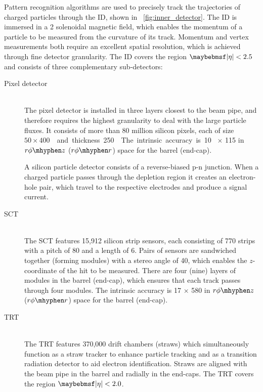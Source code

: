 Pattern recognition algorithms are used to precisely track the trajectories of charged 
particles through the \ac{ID}, shown in \Figure~\ref{fig:inner_detector}. The \ac{ID} is 
immersed in a \unit{2}{\tesla} solenoidal magnetic field, which enables the momentum of a 
particle to be measured from the curvature of its track. Momentum and vertex measurements
both require an excellent spatial resolution, which is achieved through fine detector 
granularity. The \ac{ID} covers the region $\mods{\eta} < 2.5$ and consists of three 
complementary sub-detectors:
\begin{description}
\item[Pixel detector] \hfill \\
	The pixel detector is installed in three layers closest to the beam pipe, and 
	therefore requires the highest granularity to deal with the large particle fluxes.
	It consists of more than 80 million silicon pixels, each of size 
	\unit{$50 \times 400$}{\micro\metre\squared} and thickness \unit{250}{\micro\metre}. 
	The intrinsic accuracy is \unit{10}{\micro\metre}$\,\times\,$\unit{115}{\micro\metre} 
	in $r\phi \mhyphen z$ ($r\phi \mhyphen r$) space for the barrel (end-cap).

	A silicon particle detector consists of a reverse-biased p-n junction. When a charged
	particle passes through the depletion region it creates an electron-hole pair, which 
	travel to the respective electrodes and produce a signal current.
\item[\ac{SCT}] \hfill \\
	The \ac{SCT} features 15,912 silicon strip sensors, each consisting of 770 strips 
	with a pitch of \unit{80}{\micro\metre} and a length of \unit{6}{\centi\metre}. Pairs 
	of sensors are sandwiched together (forming modules) with a stereo angle of 
	\unit{40}{\milli\radian}, which enables the $z$-coordinate of the hit to be measured. 
	There are four (nine) layers of modules in the barrel (end-cap), which ensures that 
	each track passes through four modules. 
	The intrinsic accuracy is \unit{17}{\micro\metre}$\,\times\,$\unit{580}{\micro\metre} 
	in $r\phi \mhyphen z$ ($r\phi \mhyphen r$) space for the barrel (end-cap).
\item[\ac{TRT}] \hfill \\
	The \ac{TRT} features 370,000 drift chambers (straws) which simultaneously function 
	as a straw tracker to enhance particle tracking and as a transition radiation 
	detector to aid electron identification. Straws are aligned with the beam pipe in the 
	barrel and radially in the end-caps. The \ac{TRT} covers the region 
	$\mods{\eta} < 2.0$.


\end{description}
